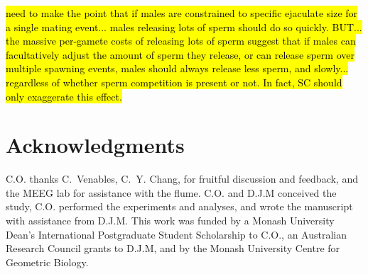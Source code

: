 \documentclass{article}
\begin{document}
\hl{need to make the point that if males are constrained to specific ejaculate size for a single mating event... males releasing lots of sperm should do so quickly.  BUT... the massive per-gamete costs of releasing lots of sperm suggest that if males can facultatively adjust the amount of sperm they release, or can release sperm over multiple spawning events, males should always release less sperm, and slowly... regardless of whether sperm competition is present or not. In fact, SC should only exaggerate this effect.}



\section*{Acknowledgments}
C.O. thanks C.~Venables, C.~Y. Chang, for fruitful discussion and feedback, and the MEEG lab for assistance with the flume. C.O. and D.J.M conceived the study, C.O. performed the experiments and analyses, and wrote the manuscript with assistance from D.J.M. This work was funded by a Monash University Dean's International Postgraduate Student Scholarship to C.O., an Australian Research Council grants to D.J.M, and by the Monash University Centre for Geometric Biology.

\newpage{}




\end{document}
